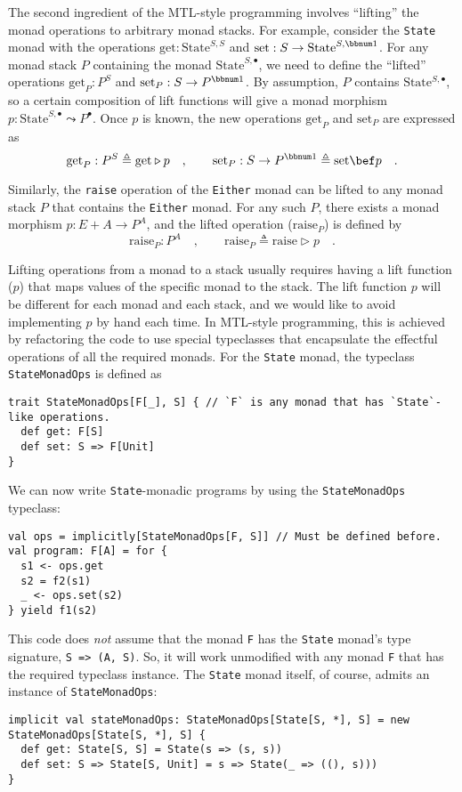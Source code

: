 The second ingredient of the MTL-style programming involves \textsf{``}lifting\textsf{''}
the monad operations to arbitrary monad stacks. For example, consider
the \lstinline!State! monad with the operations $\text{get}:\text{State}^{S,S}$
and $\text{set}:S\rightarrow\text{State}^{S,\bbnum 1}$. For any monad
stack $P$ containing the monad $\text{State}^{S,\bullet}$, we need
to define the \textsf{``}lifted\textsf{''} operations $\text{get}_{P}:P^{S}$ and
$\text{set}_{P}:S\rightarrow P^{\bbnum 1}$. By assumption, $P$ contains
$\text{State}{}^{S,\bullet}$, so a certain composition of lift functions
will give a monad morphism $p:\text{State}^{S,\bullet}\leadsto P^{\bullet}$.
Once $p$ is known, the new operations $\text{get}_{P}$ and $\text{set}_{P}$
are expressed as
\[
\text{get}_{P}:P^{S}\triangleq\text{get}\triangleright p\quad,\quad\quad\text{set}_{P}:S\rightarrow P^{\bbnum 1}\triangleq\text{set}\bef p\quad.
\]

Similarly, the \lstinline!raise! operation of the \lstinline!Either!
monad can be lifted to any monad stack $P$ that contains the \lstinline!Either!
monad. For any such $P$, there exists a monad morphism $p:E+A\rightarrow P^{A}$,
and the lifted operation ($\text{raise}_{P}$) is defined by
\[
\text{raise}_{P}:P^{A}\quad,\quad\quad\text{raise}_{P}\triangleq\text{raise}\triangleright p\quad.
\]

Lifting operations from a monad to a stack usually requires having
a lift function ($p$) that maps values of the specific monad to the
stack. The lift function $p$ will be different for each monad and
each stack, and we would like to avoid implementing $p$ by hand each
time. In MTL-style programming, this is achieved by refactoring the
code to use special typeclasses that encapsulate the effectful operations
of all the required monads. For the \lstinline!State! monad, the
typeclass \lstinline!StateMonadOps! is defined as
\begin{lstlisting}
trait StateMonadOps[F[_], S] { // `F` is any monad that has `State`-like operations.
  def get: F[S]
  def set: S => F[Unit]
}
\end{lstlisting}
We can now write \lstinline!State!-monadic programs by using the
\lstinline!StateMonadOps! typeclass:
\begin{lstlisting}
val ops = implicitly[StateMonadOps[F, S]] // Must be defined before.
val program: F[A] = for {
  s1 <- ops.get
  s2 = f2(s1)
  _ <- ops.set(s2)
} yield f1(s2)
\end{lstlisting}
This code does \emph{not} assume that the monad \lstinline!F! has
the \lstinline!State! monad\textsf{'}s type signature, \lstinline!S => (A, S)!.
So, it will work unmodified with any monad \lstinline!F! that has
the required typeclass instance. The \lstinline!State! monad itself,
of course, admits an instance of \lstinline!StateMonadOps!:
\begin{lstlisting}
implicit val stateMonadOps: StateMonadOps[State[S, *], S] = new StateMonadOps[State[S, *], S] {
  def get: State[S, S] = State(s => (s, s))
  def set: S => State[S, Unit] = s => State(_ => ((), s)))
}
\end{lstlisting}

